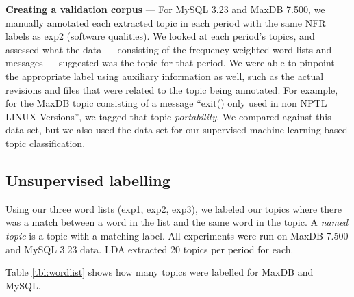 \documentclass[]{sig-alternate}
\begin{document}
\noindent \textbf{Creating a validation corpus} --- For MySQL 3.23 and MaxDB 7.500, we manually annotated each extracted topic in each period with the same NFR labels as \textsf{exp2} (software qualities). 
We looked at each period's topics, and assessed what the data --- consisting of the frequency-weighted word lists and messages --- suggested was the topic for that period. 
We were able to pinpoint the appropriate label using auxiliary information as well, such as the actual revisions and files that were related to the topic being annotated.
For example, for the MaxDB topic consisting of a message ``exit() only used in non NPTL LINUX Versions'', we tagged that topic \emph{portability}. 
We compared against this data-set, but we also used the data-set for our supervised machine learning based topic classification. 


\subsection{Unsupervised labelling}
\label{sec:unsuplabelling}


Using our three word lists (\textsf{exp1}, \textsf{exp2}, \textsf{exp3}), we labeled our topics where there was a match between a word in the list and the same word in the topic.
A \emph{named topic} is a topic with a matching label. 
All experiments were run on MaxDB 7.500 and MySQL 3.23 data. LDA extracted 20 topics per period for each.
 
Table \ref{tbl:wordlist} shows how many topics were labelled for MaxDB
and MySQL.
\end{document}
